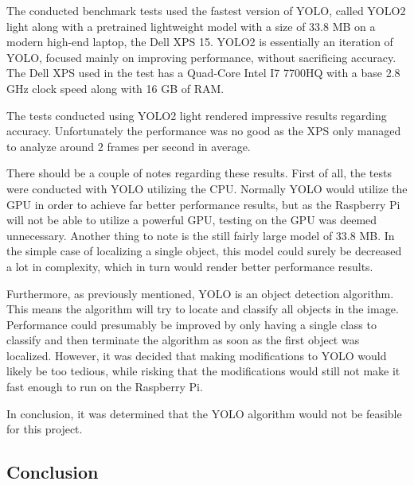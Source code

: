 The conducted benchmark tests used the fastest version of YOLO, called YOLO2 light along with a pretrained lightweight model with a size of 33.8 MB on a modern high-end laptop, the Dell XPS 15.
YOLO2 is essentially an iteration of YOLO, focused mainly on improving performance, without sacrificing accuracy\cite{yolospeed}.
The Dell XPS used in the test has a Quad-Core Intel I7 7700HQ with a base 2.8 GHz clock speed along with 16 GB of RAM.

The tests conducted using YOLO2 light rendered impressive results regarding accuracy.
Unfortunately the performance was no good as the XPS only managed to analyze around 2 frames per second in average.

There should be a couple of notes regarding these results.
First of all, the tests were conducted with YOLO utilizing the CPU.
Normally YOLO would utilize the GPU in order to achieve far better performance results, but as the Raspberry Pi will not be able to utilize a powerful GPU, testing on the GPU was deemed unnecessary. 
Another thing to note is the still fairly large model of 33.8 MB.
In the simple case of localizing a single object, this model could surely be decreased a lot in complexity, which in turn would render better performance results.

Furthermore, as previously mentioned, YOLO is an object detection algorithm.
This means the algorithm will try to locate and classify all objects in the image.
Performance could presumably be improved by only having a single class to classify and then terminate the algorithm as soon as the first object was localized.
However, it was decided that making modifications to YOLO would likely be too tedious, while risking that the modifications would still not make it fast enough to run on the Raspberry Pi.

In conclusion, it was determined that the YOLO algorithm would not be feasible for this project.

\subsection{Conclusion}
